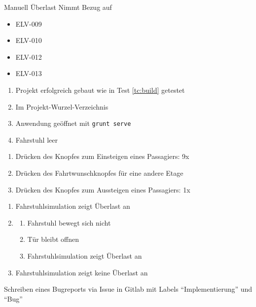 \begin{testcase}{Manuell}
\tcSubject Überlast
\tcRemark Nimmt Bezug auf
	\begin{itemize}
	\item ELV-009
	\item ELV-010
	\item ELV-012
	\item ELV-013
	\end{itemize}
\tcConditions
	\begin{enumerate}
	\item Projekt erfolgreich gebaut wie in Test \ref{tc:build} getestet
	\item Im Projekt-Wurzel-Verzeichnis
	\item Anwendung geöffnet mit \texttt{grunt serve}
	\item Fahrstuhl leer
	\end{enumerate}
\tcProceeding
	\begin{enumerate}
	\item Drücken des Knopfes zum Einsteigen eines Passagiers: 9x
	\item Drücken des Fahrtwunschknopfes für eine andere Etage
	\item Drücken des Knopfes zum Aussteigen eines Passagiers: 1x
	\end{enumerate}
\tcGoal
	\begin{enumerate}
	\item Fahrstuhlsimulation zeigt Überlast an
		\item
		\begin{enumerate}
		\item Fahrstuhl bewegt sich nicht
		\item Tür bleibt offnen
		\item Fahrstuhlsimulation zeigt Überlast an
		\end{enumerate}
	\item Fahrstuhlsimulation zeigt keine Überlast an
	\end{enumerate}
\tcError Schreiben eines Bugreports via Issue in Gitlab mit Labels "`Implementierung"' und "`Bug"'
\end{testcase}

